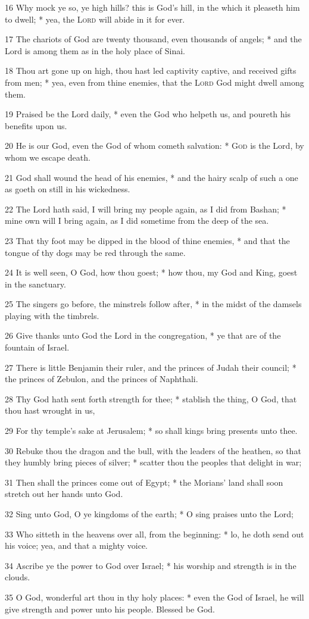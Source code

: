 16 Why mock ye so, ye high hills? this is God's hill, in the which it pleaseth him to dwell; * yea, the {\textsc{Lord}} will abide in it for ever.\par
17 The chariots of God are twenty thousand, even thousands of angels; * and the Lord is among them as in the holy place of Sinai.\par
18 Thou art gone up on high, thou hast led captivity captive, and received gifts from men; * yea, even from thine enemies, that the {\textsc{Lord}} God might dwell among them.\par
19 Praised be the Lord daily, * even the God who helpeth us, and poureth his benefits upon us.\par
20 He is our God, even the God of whom cometh salvation: * \textsc{God} is the Lord, by whom we escape death.\par
21 God shall wound the head of his enemies, * and the hairy scalp of such a one as goeth on still in his wickedness.\par
22 The Lord hath said, I will bring my people again, as I did from Bashan; * mine own will I bring again, as I did sometime from the deep of the sea.\par
23 That thy foot may be dipped in the blood of thine enemies, * and that the tongue of thy dogs may be red through the same.\par
24 It is well seen, O God, how thou goest; * how thou, my God and King, goest in the sanctuary.\par
25 The singers go before, the minstrels follow after, * in the midst of the damsels playing with the timbrels.\par
26 Give thanks unto God the Lord in the congregation, * ye that are of the fountain of Israel.\par
27 There is little Benjamin their ruler, and the princes of Judah their council; * the princes of Zebulon, and the princes of Naphthali.\par
28 Thy God hath sent forth strength for thee; * stablish the thing, O God, that thou hast wrought in us,\par
29 For thy temple's sake at Jerusalem; * so shall kings bring presents unto thee.\par
30 Rebuke thou the dragon and the bull, with the leaders of the heathen, so that they humbly bring pieces of silver; * scatter thou the peoples that delight in war;\par
31 Then shall the princes come out of Egypt; * the Morians' land shall soon stretch out her hands unto God.\par
32 Sing unto God, O ye kingdoms of the earth; * O sing praises unto the Lord;\par
33 Who sitteth in the heavens over all, from the beginning: * lo, he doth send out his voice; yea, and that a mighty voice.\par
34 Ascribe ye the power to God over Israel; * his worship and strength is in the clouds.\par
35 O God, wonderful art thou in thy holy places: * even the God of Israel, he will give strength and power unto his people. Blessed be God.
